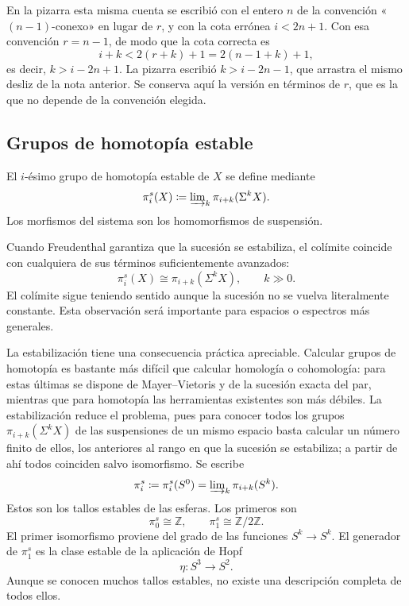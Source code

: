 \begin{nota}
   En la pizarra esta misma cuenta se escribió con el entero \(n\) de la convención «\((n-1)\)-conexo» en lugar de \(r\), y con la cota errónea \(i<2n+1\). Con esa convención \(r=n-1\), de modo que la cota correcta es
   \[
   i+k<2(r+k)+1=2(n-1+k)+1,
   \]
   es decir, \(k>i-2n+1\). La pizarra escribió \(k>i-2n-1\), que arrastra el mismo desliz de la nota anterior. Se conserva aquí la versión en términos de \(r\), que es la que no depende de la convención elegida.
\end{nota}

\subsection{Grupos de homotopía estable}

El \(i\)-ésimo grupo de homotopía estable de \(X\) se define mediante
\[
\pi_i^s(X)\coloneqq \varinjlim\nolimits_k \pi_{i+k}(\Sigma^kX).
\]
Los morfismos del sistema son los homomorfismos de suspensión.

Cuando Freudenthal garantiza que la sucesión se estabiliza, el colímite coincide con cualquiera de sus términos suficientemente avanzados:
\[
\pi_i^s(X)\cong\pi_{i+k}(\Sigma^kX),\qquad k\gg0.
\]
El colímite sigue teniendo sentido aunque la sucesión no se vuelva literalmente constante. Esta observación será importante para espacios o espectros más generales.

La estabilización tiene una consecuencia práctica apreciable. Calcular grupos de homotopía es bastante más difícil que calcular homología o cohomología: para estas últimas se dispone de Mayer--Vietoris y de la sucesión exacta del par, mientras que para homotopía las herramientas existentes son más débiles. La estabilización reduce el problema, pues para conocer todos los grupos \(\pi_{i+k}(\Sigma^kX)\) de las suspensiones de un mismo espacio basta calcular un número finito de ellos, los anteriores al rango en que la sucesión se estabiliza; a partir de ahí todos coinciden salvo isomorfismo.
Se escribe
\[
\pi_i^s\coloneqq \pi_i^s(S^0)=\varinjlim\nolimits_k\pi_{i+k}(S^k).
\]
Estos son los tallos estables de las esferas. Los primeros son
\[
\pi_0^s\cong\mathbb Z,\qquad \pi_1^s\cong\mathbb Z/2\mathbb Z.
\]
El primer isomorfismo proviene del grado de las funciones \(S^k\to S^k\). El generador de \(\pi_1^s\) es la clase estable de la aplicación de Hopf
\[
\eta\colon S^3\longrightarrow S^2.
\]
Aunque se conocen muchos tallos estables, no existe una descripción completa de todos ellos.

